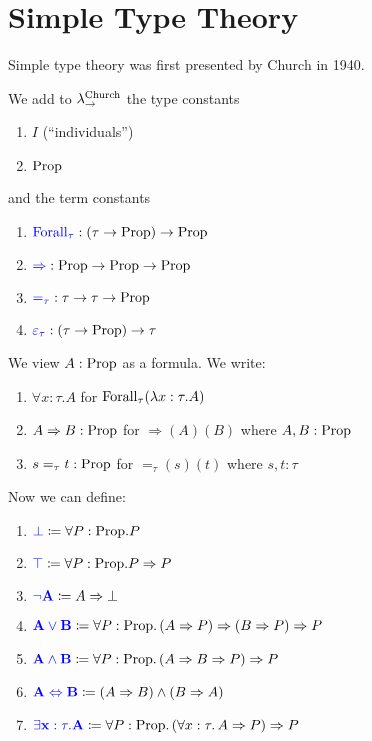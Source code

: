 \section{Simple Type Theory}

Simple type theory was first presented by Church in 1940.

\begin{boxdefi}
    We add to $\lambda_{\to}^{\textnormal{Church}}$ the type constants
    \begin{enumerate}
        \item \alert{$I$} (``\alert{individuals}'')
        \item \alert{$\mathrm{Prop}$}
    \end{enumerate}
    and the term constants
    \begin{enumerate}
        \item $\alert{\forallterm{\tau}} : (\tau \to \proptype) \to \proptype$
        \item $\alert{{\Rightarrow}} : \proptype \to \proptype \to \proptype$
        \item $\alert{=_\tau} : \tau \to \tau \to \proptype$
        \item $\alert{\varepsilon_\tau} : (\tau \to \proptype) \to \tau$
    \end{enumerate}
    We view $A : \mathrm{Prop}$ as a formula.
    We write:
    \begin{enumerate}
        \item $\forall x : \tau. A$ for $\mathrm{Forall}_{\tau}(\lambda x : \tau.A)$
        \item $A \Rightarrow B : \mathrm{Prop}$ for ${\Rightarrow} (A)(B)$ where $A, B : \mathrm{Prop}$
        \item $s =_\tau t : \mathrm{Prop}$ for ${=_\tau}(s)(t)$ where $s, t : \tau$
    \end{enumerate}
    Now we can define:
    \begin{enumerate}
        \item $\alert{\bot} \coloneq \forall P : \proptype. P$
        \item $\alert{\top} \coloneq \forall P : \proptype. P \Rightarrow P$
        \item $\alert{\neg A} \coloneq A \Rightarrow \bot$
        \item $\alert{A \vee B} \coloneq \forall P:\proptype.\,(A\Rightarrow P)\Rightarrow(B\Rightarrow P)\Rightarrow P$
        \item $\alert{A \wedge B} \coloneq \forall P:\proptype.\,(A\Rightarrow B\Rightarrow P)\Rightarrow P$
        \item $\alert{A \Leftrightarrow B} \coloneq (A \Rightarrow B) \wedge (B \Rightarrow A)$
        \item $\alert{\exists x : \tau. A} \coloneq \forall P:\proptype.\,(\forall x:\tau.\, A\Rightarrow P)\Rightarrow P$
    \end{enumerate}
\end{boxdefi}

